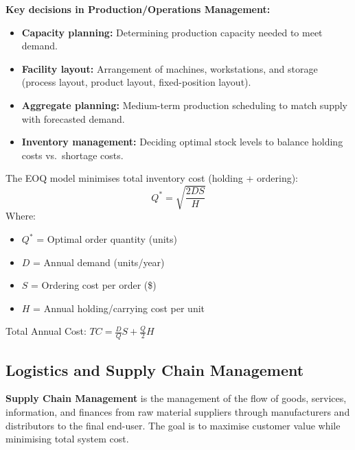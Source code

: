 \documentclass[12pt,a4paper]{article}
\begin{document}
\textbf{Key decisions in Production/Operations Management:}
\begin{itemize}[leftmargin=*, itemsep=2pt]
  \item \textbf{Capacity planning:} Determining production capacity needed to meet demand.
  \item \textbf{Facility layout:} Arrangement of machines, workstations, and storage (process layout, product layout, fixed-position layout).
  \item \textbf{Aggregate planning:} Medium-term production scheduling to match supply with forecasted demand.
  \item \textbf{Inventory management:} Deciding optimal stock levels to balance holding costs vs.\ shortage costs.
\end{itemize}

\begin{tcolorbox}[formulabox, title={\textbf{Economic Order Quantity (EOQ)}}]
The EOQ model minimises total inventory cost (holding + ordering):
\begin{equation}
  Q^* = \sqrt{\frac{2DS}{H}}
\end{equation}
Where:
\begin{itemize}[leftmargin=1.5em, itemsep=1pt, topsep=2pt]
  \item[] $Q^*$ = Optimal order quantity (units)
  \item[] $D$ = Annual demand (units/year)
  \item[] $S$ = Ordering cost per order (\$)
  \item[] $H$ = Annual holding/carrying cost per unit
\end{itemize}
\par\vspace{4pt}
Total Annual Cost: $\displaystyle TC = \frac{D}{Q}S + \frac{Q}{2}H$
\end{tcolorbox}

\subsection{Logistics and Supply Chain Management}

\begin{tcolorbox}[defbox, title={\textbf{Supply Chain Management (SCM)}}]
\textbf{Supply Chain Management} is the management of the flow of goods, services, information, and finances from raw material suppliers through manufacturers and distributors to the final end-user. The goal is to maximise customer value while minimising total system cost.
\end{tcolorbox}
\end{document}
